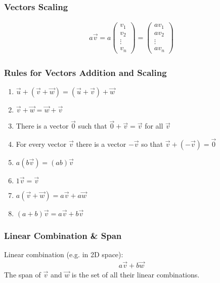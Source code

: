 \subsubsection*{Vectors Scaling}

\begin{align*}
	a\vec{v}=a\begin{pmatrix}
	v_1 \\ v_2 \\ \vdots \\ v_n
	\end{pmatrix}=\begin{pmatrix}
	av_1 \\ av_2 \\ \vdots \\ av_n
	\end{pmatrix}
\end{align*}

\subsubsection*{Rules for Vectors Addition and Scaling}

\begin{enumerate}
	\item $\vec{u}+\left(\vec{v}+\vec{w}\right)=\left(\vec{u}+\vec{v}\right)+\vec{w}$
	\item $\vec{v}+\vec{w}=\vec{w}+\vec{v}$
	\item There is a vector $\vec{0}$ such that $\vec{0}+\vec{v}=\vec{v}$ for all $\vec{v}$
	\item For every vector $\vec{v}$ there is a vector $-\vec{v}$ so that $\vec{v}+\left(-\vec{v}\right)=\vec{0}$
	\item $a\left(b\vec{v}\right)=\left(ab\right)\vec{v}$
	\item $1\vec{v}=\vec{v}$
	\item $a\left(\vec{v}+\vec{w}\right)=a\vec{v}+a\vec{w}$
	\item $\left(a+b\right)\vec{v}=a\vec{v}+b\vec{v}$
\end{enumerate}

\subsubsection*{Linear Combination \& Span}

Linear combination (e.g. in 2D space):
\begin{align*}
	a\vec{v}+b\vec{w}
\end{align*}
The span of $\vec{v}$ and $\vec{w}$ is the set of all their linear combinations.

